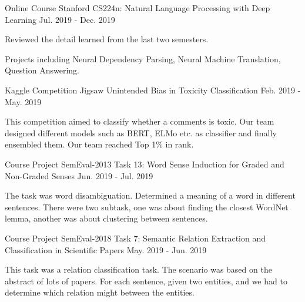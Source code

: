 \begin{cventries}
  \cventry
    {Online Course} %
    {Stanford CS224n: Natural Language Processing with Deep Learning} %
    {} %
    {Jul. 2019 - Dec. 2019} %
    {
      \begin{cvitems} %
        \item {Reviewed the detail learned from the last two semesters.}
        \item {Projects including Neural Dependency Parsing, Neural Machine Translation, Question Answering.}
      \end{cvitems}
    }

  \cventry
    {Kaggle Competition} %
    {Jigsaw Unintended Bias in Toxicity Classification} %
    {} %
    {Feb. 2019 - May. 2019} %
    {
      \begin{cvitems} %
        \item {This competition aimed to classify whether a comments is toxic. Our team designed different models such as BERT, ELMo etc. as classifier and finally ensembled them. Our team reached Top 1\% in rank.}
      \end{cvitems}
    }

  \cventry
    {Course Project} %
    {SemEval-2013 Task 13: Word Sense Induction for Graded and Non-Graded Senses} %
    {} %
    {Jun. 2019 - Jul. 2019} %
    {
      \begin{cvitems} %
        \item {The task was word disambiguation. Determined a meaning of a word in different sentences. There were two subtask, one was about finding the closest WordNet lemma, another was about clustering between sentences.}
      \end{cvitems}
    }

  \cventry
    {Course Project} %
    {SemEval-2018 Task 7: Semantic Relation Extraction and Classification in Scientific Papers} %
    {} %
    {May. 2019 - Jun. 2019} %
    {
      \begin{cvitems} %
        \item {This task was a relation classification task. The scenario was based on the abstract of lots of papers. For each sentence, given two entities, and we had to determine which relation might between the entities.}
      \end{cvitems}
    }


\end{cventries}
